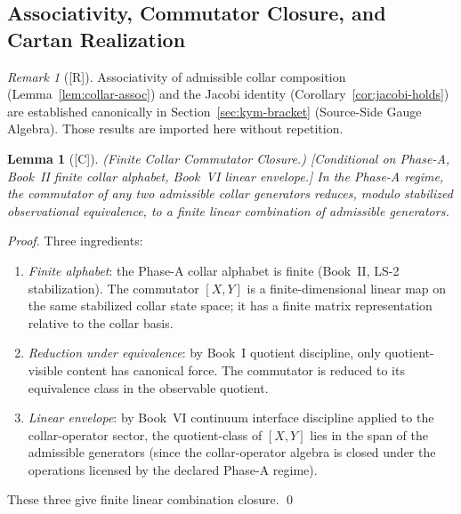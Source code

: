 \documentclass[12pt,oneside]{amsbook}
\theoremstyle{plain}
\newtheorem{lemma}[theorem]{Lemma}
\theoremstyle{definition}
\theoremstyle{remark}
\newtheorem{remark}[theorem]{Remark}
\newcommand{\status}[1]{\textup{[#1]}}
\begin{document}
\subsection{Associativity, Commutator Closure, and Cartan Realization}

\begin{remark}[\status{R}]
Associativity of admissible collar composition
(Lemma~\ref{lem:collar-assoc}) and the Jacobi identity
(Corollary~\ref{cor:jacobi-holds}) are established canonically
in Section~\ref{sec:kym-bracket} (Source-Side Gauge Algebra).
Those results are imported here without repetition.
\end{remark}

\begin{lemma}[\status{C}]\label{lem:commutator-closure}
\textup{(Finite Collar Commutator Closure.)}
\textup{[Conditional on Phase-A, Book~II finite collar alphabet, Book~VI
linear envelope.]}
In the Phase-A regime, the commutator of any two admissible collar
generators reduces, modulo stabilized observational equivalence, to a
finite linear combination of admissible generators.
\end{lemma}

\begin{proof}
Three ingredients:
\begin{enumerate}[label=\textup{(\arabic*)}]
 \item \emph{Finite alphabet}: the Phase-A collar alphabet is finite
 (Book~II, LS-2 stabilization). The commutator $[X,Y]$ is a
 finite-dimensional linear map on the same stabilized collar state
 space; it has a finite matrix representation relative to the
 collar basis.
 \item \emph{Reduction under equivalence}: by Book~I quotient
 discipline, only quotient-visible content has canonical force.
 The commutator is reduced to its equivalence class in the
 observable quotient.
 \item \emph{Linear envelope}: by Book~VI continuum interface
 discipline applied to the collar-operator sector, the
 quotient-class of $[X,Y]$ lies in the span of the admissible
 generators (since the collar-operator algebra is closed under
 the operations licensed by the declared Phase-A regime).
\end{enumerate}
These three give finite linear combination closure. \qed
\end{proof}
\end{document}
